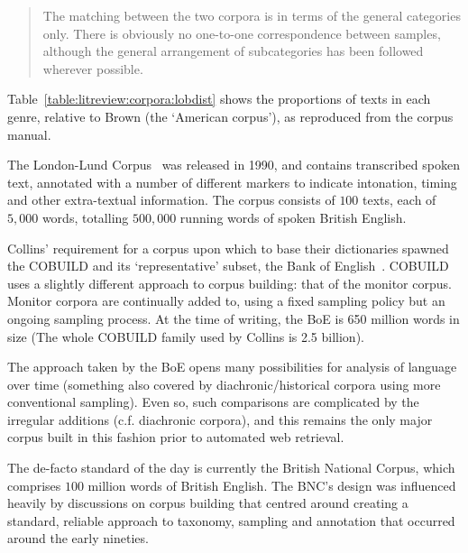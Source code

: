 \begin{quote}
    The matching between the two corpora is in terms of the general categories only. There is obviously no one-to-one correspondence between samples, although the general arrangement of subcategories has been followed wherever possible.
\end{quote}

Table~\ref{table:litreview:corpora:lobdist} shows the proportions of texts in each genre, relative to Brown (the `American corpus'), as reproduced from the corpus manual.

The London-Lund Corpus~\cite{greenbaum1990london} was released in 1990, and contains transcribed spoken text, annotated with a number of different markers to indicate intonation, timing and other extra-textual information.  
The corpus consists of $100$ texts, each of $5,000$ words, totalling $500,000$ running words of spoken British English.



Collins' requirement for a corpus upon which to base their dictionaries spawned the COBUILD and its `representative' subset, the Bank of English~\cite{Jarvinen1994AMW991886.991985,sinclair1987looking}.  COBUILD uses a slightly different approach to corpus building: that of the monitor corpus.  Monitor corpora are continually added to, using a fixed sampling policy but an ongoing sampling process.  At the time of writing, the BoE is 650 million words in size (The whole COBUILD family used by Collins is 2.5 billion).

The approach taken by the BoE opens many possibilities for analysis of language over time (something also covered by diachronic/historical corpora using more conventional sampling).  Even so, such comparisons are complicated by the irregular additions (c.f. diachronic corpora), and this remains the only major corpus built in this fashion prior to automated web retrieval.


The de-facto standard of the day is currently the British National Corpus, which comprises $100$ million words of British English.  The BNC's design was influenced heavily by discussions on corpus building that centred around creating a standard, reliable approach to taxonomy, sampling and annotation that occurred around the early nineties.

